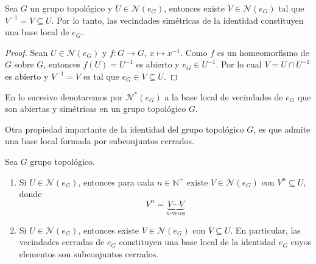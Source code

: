 \documentclass[12pt]{report}
\theoremstyle{largebreak}
\newcommand{\cf}[3]{\ensuremath{#1:#2\rightarrow#3}}
\newcommand{\N}[1]{\ensuremath{\mathscr{N}(#1)}}
\newcommand{\Ns}[1]{\ensuremath{\mathscr{N}^*(#1)}}
\begin{document}
    \begin{lema}
        Sea $G$ un grupo topológico y $U\in\N{e_G}$, entonces existe $V\in\N{e_G}$ tal que $V^{-1}=V\subseteq U$. Por lo tanto, las vecindades simétricas de la identidad constituyen una base local de $e_G$.
    \end{lema}

    \begin{proof}
        Sean $U\in\N{e_G}$ y $\cf{f}{G}{G}$, $x\mapsto x^{-1}$. Como $f$ es un homeomorfismo de $G$ sobre $G$, entonces $f(U)=U^{-1}$ es abierto y $e_G\in U^{-1}$. Por lo cual $V=U\cap U^{-1}$ es abierto y $V^{-1}=V$ es tal que $e_G\in V\subseteq U$.
    \end{proof}

    En lo sucesivo denotaremos por $\Ns{e_G}$ a la base local de vecindades de $e_G$ que son abiertas y simétricas en un grupo topológico $G$.

    Otra propiedad importante de la identidad del grupo topológico $G$, es que admite una base local formada por subconjuntos cerrados.

    \begin{lema}
        Sea $G$ grupo topológico.
        \begin{enumerate}
            \item Si $U\in\N{e_G}$, entonces para cada $n\in\mathbb{N}^+$ existe $V\in\N{e_G}$ con $V^{n}\subseteq U$, donde
            \begin{equation*}
                V^n=\underbrace{V\cdots V}_{n\text{-veces}}
            \end{equation*}
            \item Si $U\in\N{e_G}$, entonces existe $V\in\N{e_G}$ con $\overline{V}\subseteq U$. En particular, las vecindades cerradas de $e_G$ constituyen una base local de la identidad $e_G$ cuyos elementos son subconjuntos cerrados.
        \end{enumerate}
    \end{lema}
\end{document}
